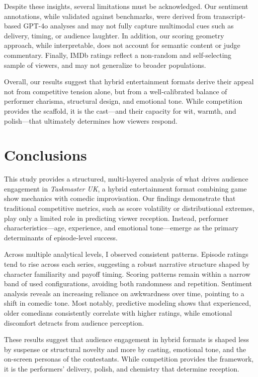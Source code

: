 \documentclass[10pt,letterpaper]{article}
\begin{document}
Despite these insights, several limitations must be acknowledged. Our sentiment annotations, while validated against benchmarks, were derived from transcript-based GPT-4o analyses and may not fully capture multimodal cues such as delivery, timing, or audience laughter. In addition, our scoring geometry approach, while interpretable, does not account for semantic content or judge commentary. Finally, IMDb ratings reflect a non-random and self-selecting sample of viewers, and may not generalize to broader populations.

Overall, our results suggest that hybrid entertainment formats derive their appeal not from competitive tension alone, but from a well-calibrated balance of performer charisma, structural design, and emotional tone. While competition provides the scaffold, it is the cast—and their capacity for wit, warmth, and polish—that ultimately determines how viewers respond.

\section*{Conclusions}

This study provides a structured, multi-layered analysis of what drives audience engagement in \textit{Taskmaster UK}, a hybrid entertainment format combining game show mechanics with comedic improvisation. Our findings demonstrate that traditional competitive metrics, such as score volatility or distributional extremes, play only a limited role in predicting viewer reception. Instead, performer characteristics—age, experience, and emotional tone—emerge as the primary determinants of episode-level success.

Across multiple analytical levels, I observed consistent patterns. Episode ratings tend to rise across each series, suggesting a robust narrative structure shaped by character familiarity and payoff timing. Scoring patterns remain within a narrow band of used configurations, avoiding both randomness and repetition. Sentiment analysis reveals an increasing reliance on awkwardness over time, pointing to a shift in comedic tone. Most notably, predictive modeling shows that experienced, older comedians consistently correlate with higher ratings, while emotional discomfort detracts from audience perception.

These results suggest that audience engagement in hybrid formats is shaped less by suspense or structural novelty and more by casting, emotional tone, and the on-screen personas of the contestants. While competition provides the framework, it is the performers’ delivery, polish, and chemistry that determine reception.
\end{document}
